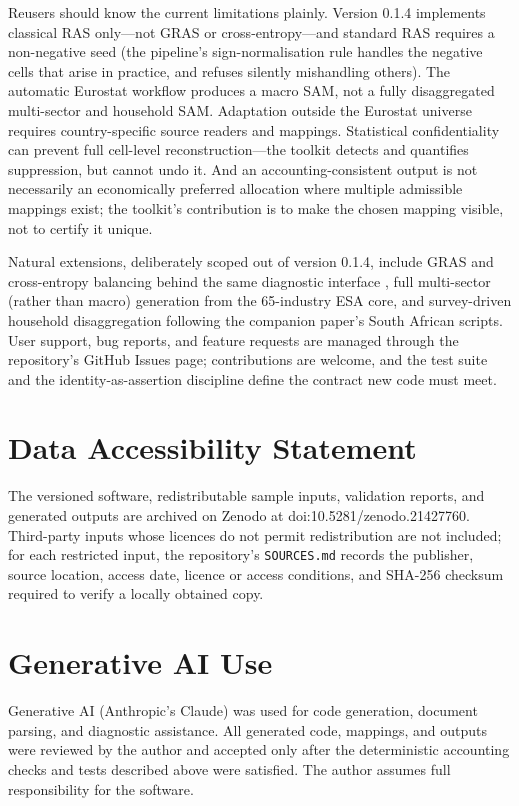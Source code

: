 \documentclass[11pt,a4paper]{article}
\begin{document}
Reusers should know the current limitations plainly. Version 0.1.4
implements classical RAS only---not GRAS or cross-entropy---and standard
RAS requires a non-negative seed (the pipeline's sign-normalisation rule
handles the negative cells that arise in practice, and refuses
silently mishandling others). The automatic Eurostat workflow produces a
macro SAM, not a fully disaggregated multi-sector and household SAM.
Adaptation outside the Eurostat universe requires country-specific
source readers and mappings. Statistical confidentiality can prevent
full cell-level reconstruction---the toolkit detects and quantifies
suppression, but cannot undo it. And an accounting-consistent output is
not necessarily an economically preferred allocation where multiple
admissible mappings exist; the toolkit's contribution is to make the
chosen mapping visible, not to certify it unique.

Natural extensions, deliberately scoped out of version 0.1.4, include
GRAS and cross-entropy balancing behind the same diagnostic interface
\cite{robinson2001,temurshoev2013}, full multi-sector (rather than
macro) generation from the 65-industry ESA core, and survey-driven
household disaggregation following the companion paper's South African
scripts. User support, bug reports, and feature requests are managed through
the repository's GitHub Issues page; contributions are welcome, and the
test suite and the identity-as-assertion discipline define the contract
new code must meet.

\section*{Data Accessibility Statement}
The versioned software, redistributable sample inputs, validation
reports, and generated outputs are archived on Zenodo at
doi:10.5281/zenodo.21427760. Third-party inputs whose licences do not permit
redistribution are not included; for each restricted input, the
repository's \texttt{SOURCES.md} records the publisher, source
location, access date, licence or access conditions, and SHA-256
checksum required to verify a locally obtained copy.

\section*{Generative AI Use}
Generative AI (Anthropic's Claude) was used for code generation,
document parsing, and diagnostic assistance. All generated code,
mappings, and outputs were reviewed by the author and accepted only
after the deterministic accounting checks and tests described above
were satisfied. The author assumes full responsibility for the
software.
\end{document}
